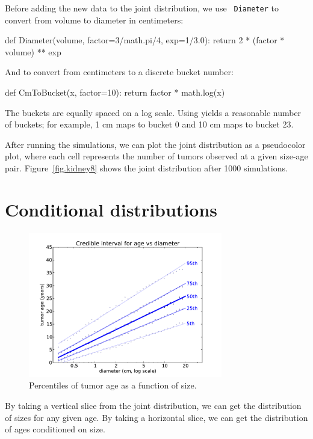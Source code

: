 \documentclass[12pt]{book}
\theoremstyle{exercise}
\begin{document}
Before adding the new data to the joint distribution, we use {\tt
  Diameter} to convert from volume to diameter in centimeters:

\begin{code}
def Diameter(volume, factor=3/math.pi/4, exp=1/3.0):
    return 2 * (factor * volume) ** exp
\end{code}

And
 to convert from centimeters to a discrete bucket
number:

\begin{code}
def CmToBucket(x, factor=10):
    return factor * math.log(x)
\end{code}

The buckets are equally spaced on a log scale.  Using 
yields a reasonable number of buckets; for example,
1 cm maps to bucket 0 and 10 cm maps to bucket 23.

After running the simulations, we can plot the joint distribution
as a pseudocolor plot, where each cell represents the number of
tumors observed at a given size-age pair.
Figure~\ref{fig.kidney8} shows the joint distribution after 1000
simulations.



\section{Conditional distributions}

\begin{figure}
\centerline{\includegraphics[height=2.5in]{figs/kidney7.pdf}}
\caption{Percentiles of tumor age as a function of size.}
\label{fig.kidney7}
\end{figure}

By taking a vertical slice from the joint distribution, we can get the
distribution of sizes for any given age.  By taking a horizontal
slice, we can get the distribution of ages conditioned on size.
\end{document}
